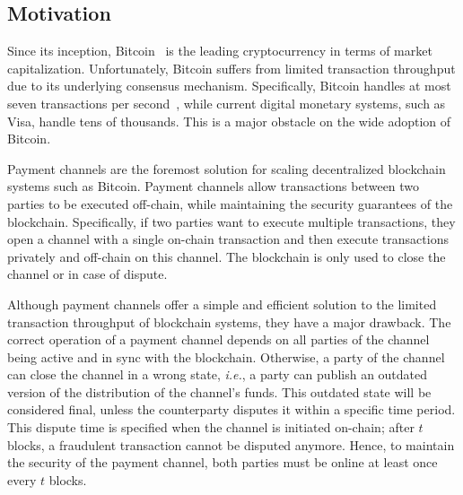 \documentclass[runningheads]{llncs}
\newcommand{\ie}{{\em i.e.}}
\begin{document}
\subsection{Motivation}

Since its inception, Bitcoin~\cite{nakamoto2008bitcoin} is the leading cryptocurrency in terms of market capitalization. Unfortunately, Bitcoin suffers from limited transaction throughput due to its underlying consensus mechanism. Specifically, Bitcoin handles at most seven
transactions per second~\cite{croman2016scaling}, while current digital monetary systems, such as Visa, handle tens of thousands. This is a major obstacle on the wide adoption of Bitcoin.

Payment channels are the foremost solution for scaling decentralized block\-chain systems such as Bitcoin.
Payment channels allow transactions between two parties to be executed off-chain, while maintaining the security guarantees of the blockchain. Specifically, if two parties want to execute multiple transactions, they open a channel with a single on-chain transaction and then execute transactions privately and off-chain on this channel. The blockchain is only used to close the channel or in case of dispute. 

Although payment channels offer a simple and efficient solution to the  limited transaction throughput of blockchain systems, %
they have a major drawback.
The correct operation of a payment channel depends on all parties of the channel being active and in sync with the blockchain. Otherwise, a party of the channel can close the channel in a wrong state, \ie, a party can publish an outdated version of the distribution of the channel's funds.
This outdated state will be considered final, 
unless the counterparty disputes it within a specific time period.
This dispute time is specified when the channel is initiated on-chain; after $t$ blocks, a fraudulent transaction cannot be disputed anymore. Hence, to maintain the security of the payment channel, both parties must be online at least once every $t$ blocks.
\end{document}
